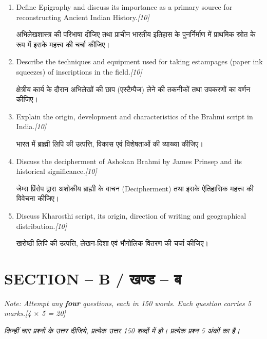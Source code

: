 \documentclass[11pt,a4paper]{article}
\newcommand{\pts}[1]{\hfill \textit{[#1]}}
\begin{document}
\begin{enumerate}[label=\textbf{\arabic*.},leftmargin=*,itemsep=12pt]

  \item Define Epigraphy and discuss its importance as a primary source for reconstructing Ancient Indian History.\pts{10}
  
  अभिलेखशास्त्र की परिभाषा दीजिए तथा प्राचीन भारतीय इतिहास के पुनर्निर्माण में प्राथमिक स्रोत के रूप में इसके महत्त्व की चर्चा कीजिए।

  \item Describe the techniques and equipment used for taking estampages (paper ink squeezes) of inscriptions in the field.\pts{10}
  
  क्षेत्रीय कार्य के दौरान अभिलेखों की छाप (एस्टैम्पैज) लेने की तकनीकों तथा उपकरणों का वर्णन कीजिए।

  \item Explain the origin, development and characteristics of the Brahmi script in India.\pts{10}
  
  भारत में ब्राह्मी लिपि की उत्पत्ति, विकास एवं विशेषताओं की व्याख्या कीजिए।

  \item Discuss the decipherment of Ashokan Brahmi by James Prinsep and its historical significance.\pts{10}
  
  जेम्स प्रिंसेप द्वारा अशोकीय ब्राह्मी के वाचन (Decipherment) तथा इसके ऐतिहासिक महत्त्व की विवेचना कीजिए।

  \item Discuss Kharosthi script, its origin, direction of writing and geographical distribution.\pts{10}
  
  खरोष्ठी लिपि की उत्पत्ति, लेखन-दिशा एवं भौगोलिक वितरण की चर्चा कीजिए।

\end{enumerate}

\bigskip

\section*{SECTION -- B / खण्ड -- ब}
\noindent \textit{Note: Attempt any \textbf{four} questions, each in 150 words. Each question carries 5 marks.}\pts{4 $\times$ 5 = 20}

\noindent \textit{किन्हीं चार प्रश्नों के उत्तर दीजिये, प्रत्येक उत्तर 150 शब्दों में हो। प्रत्येक प्रश्न 5 अंकों का है।}
\end{document}
